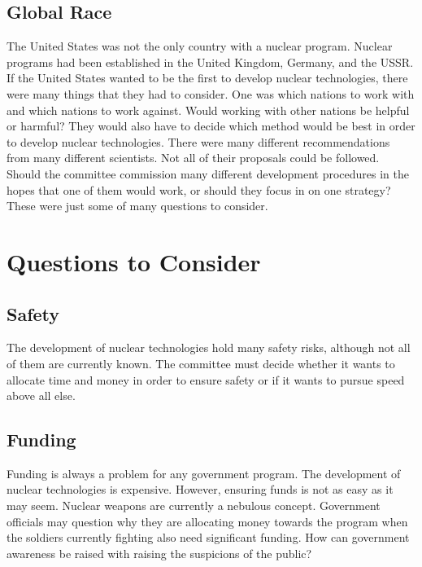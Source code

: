 \documentclass[11 pt, twoside]{article}
\begin{document}
\subsection{Global Race}
	The United States was not the only country with a nuclear program. Nuclear programs had been established in the United Kingdom, Germany, and the USSR. If the United States wanted to be the first to develop nuclear technologies, there were many things that they had to consider. One was which nations to work with and which nations to work against. Would working with other nations be helpful or harmful? They would also have to decide which method would be best in order to develop nuclear technologies. There were many different recommendations from many different scientists. Not all of their proposals could be followed. Should the committee commission many different development procedures in the hopes that one of them would work, or should they focus in on one strategy? These were just some of many questions to consider. 

\section{Questions to Consider}

\subsection{Safety}
The development of nuclear technologies hold many safety risks, although not all of them are currently known. The committee must decide whether it wants to allocate time and money in order to ensure safety or if it wants to pursue speed above all else.

\subsection{Funding}
Funding is always a problem for any government program. The development of nuclear technologies is expensive. However, ensuring funds is not as easy as it may seem. Nuclear weapons are currently a nebulous concept. Government officials may question why they are allocating money towards the program when the soldiers currently fighting also need significant funding. How can government awareness be raised with raising the suspicions of the public? 
\end{document}
